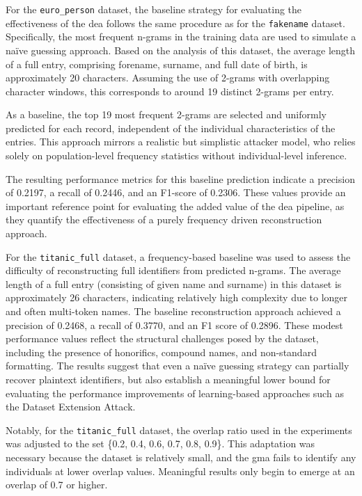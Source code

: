 For the \texttt{euro\_person} dataset, the baseline strategy for evaluating the effectiveness of the \ac{dea} follows the same procedure as for the \texttt{fakename} dataset.
Specifically, the most frequent n-grams in the training data are used to simulate a naïve guessing approach.
Based on the analysis of this dataset, the average length of a full entry, comprising forename, surname, and full date of birth, is approximately 20 characters.
Assuming the use of 2-grams with overlapping character windows, this corresponds to around 19 distinct 2-grams per entry.

As a baseline, the top 19 most frequent 2-grams are selected and uniformly predicted for each record, independent of the individual characteristics of the entries.
This approach mirrors a realistic but simplistic attacker model, who relies solely on population-level frequency statistics without individual-level inference.

The resulting performance metrics for this baseline prediction indicate a precision of 0.2197, a recall of 0.2446, and an F1-score of 0.2306.
These values provide an important reference point for evaluating the added value of the \ac{dea} pipeline, as they quantify the effectiveness of a purely frequency driven reconstruction approach.

For the \texttt{titanic\_full} dataset, a frequency-based baseline was used to assess the difficulty of reconstructing full identifiers from predicted n-grams.
The average length of a full entry (consisting of given name and surname) in this dataset is approximately 26 characters, indicating relatively high complexity due to longer and often multi-token names.
The baseline reconstruction approach achieved a precision of 0.2468, a recall of 0.3770, and an F1 score of 0.2896.
These modest performance values reflect the structural challenges posed by the dataset, including the presence of honorifics, compound names, and non-standard formatting.
The results suggest that even a naïve guessing strategy can partially recover plaintext identifiers, but also establish a meaningful lower bound for evaluating the performance improvements of learning-based approaches such as the Dataset Extension Attack.

Notably, for the \texttt{titanic\_full} dataset, the overlap ratio used in the experiments was adjusted to the set \{0.2, 0.4, 0.6, 0.7, 0.8, 0.9\}.
This adaptation was necessary because the dataset is relatively small, and the \ac{gma} fails to identify any individuals at lower overlap values.
Meaningful results only begin to emerge at an overlap of 0.7 or higher.

